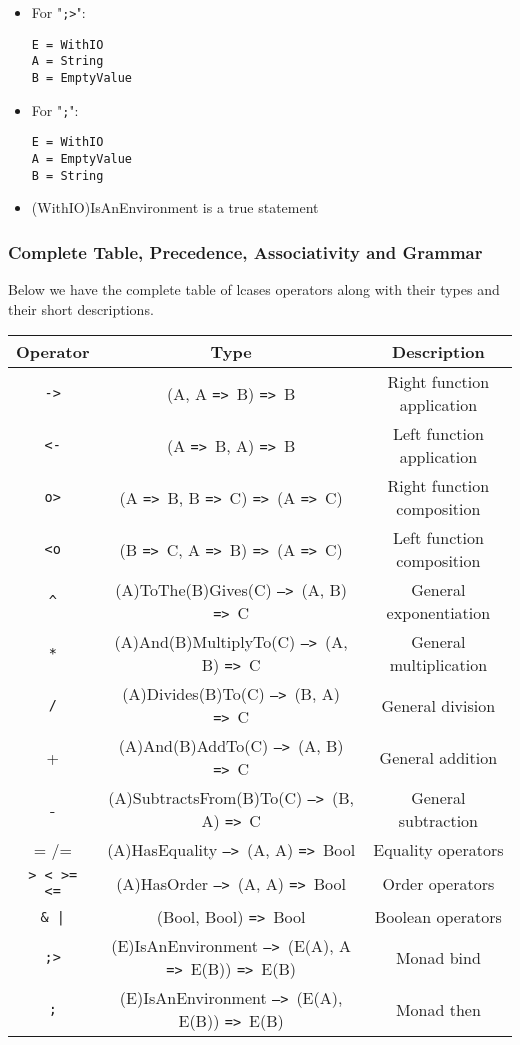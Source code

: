 \documentclass{article}
\def\ra{\texttt{=>}\ }
\def\Ra{\texttt{-->}\ }
\begin{document}
\begin{itemize}

\item
For "\texttt{;>}":
\begin{verbatim}
E = WithIO
A = String
B = EmptyValue
\end{verbatim}

\item
For "\texttt{;}":
\begin{verbatim}
E = WithIO
A = EmptyValue
B = String
\end{verbatim}

\item (WithIO)IsAnEnvironment is a true statement
\end{itemize}

\subsubsection{Complete Table, Precedence, Associativity and Grammar}

Below we have the complete table of lcases operators along with their types and 
their short descriptions.
\begin{center}
\begin{tabular}{ |c|c|c| } 
\hline
Operator & Type & Description \\ 
\hline
\hline
\texttt{->} & (A, A \ra B) \ra B & Right function application \\
\hline
\texttt{<-} & (A \ra B, A) \ra B & Left function application \\
\hline
\texttt{o>} & (A \ra B, B \ra C) \ra (A \ra C) & Right function composition \\
\hline
\texttt{<o} & (B \ra C, A \ra B) \ra (A \ra C) & Left function composition \\
\hline
\texttt{\^} & (A)ToThe(B)Gives(C) \Ra (A, B) \ra C & General exponentiation  \\
\hline
\texttt{*} & (A)And(B)MultiplyTo(C) \Ra (A, B) \ra C & General multiplication  \\
\hline
\texttt{/} & (A)Divides(B)To(C) \Ra (B, A) \ra C & General division \\
\hline
+ & (A)And(B)AddTo(C) \Ra (A, B) \ra C & General addition \\ 
\hline
- & (A)SubtractsFrom(B)To(C) \Ra (B, A) \ra C & General subtraction \\
\hline
= /= & (A)HasEquality \Ra (A, A) \ra Bool & Equality operators \\
\hline
\texttt{> < >= <=} & (A)HasOrder \Ra (A, A) \ra Bool & Order operators \\
\hline
\texttt{\& |} & (Bool, Bool) \ra Bool & Boolean operators \\
\hline
\texttt{;>} & (E)IsAnEnvironment \Ra (E(A), A \ra E(B)) \ra E(B) &
Monad bind \\
\hline
\texttt{;} & (E)IsAnEnvironment \Ra (E(A), E(B)) \ra E(B) &
Monad then \\
\hline
\end{tabular}
\end{center}
\end{document}
